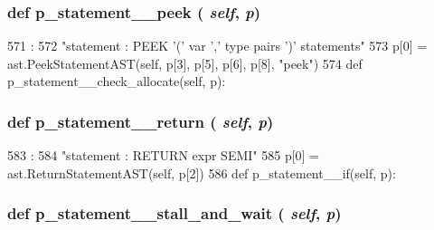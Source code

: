 \begin{DoxyVerb}
{\subsubsection[{p\_\-statement\_\-\_\-peek}]{\setlength{\rightskip}{0pt plus 5cm}def p\_\-statement\_\-\_\-peek ( {\em self}, \/   {\em p})}}
\label{classslicc_1_1parser_1_1SLICC_a015764d4d63d518e62c8b10217683dee}



\begin{DoxyCode}
571                                   :
572         "statement : PEEK '(' var ',' type pairs ')' statements"
573         p[0] = ast.PeekStatementAST(self, p[3], p[5], p[6], p[8], "peek")
574 
    def p_statement__check_allocate(self, p):
\end{DoxyCode}
\hypertarget{classslicc_1_1parser_1_1SLICC_a2e1afae014e0dda4da7c49f97517b021}{
\subsubsection[{p\_\-statement\_\-\_\-return}]{\setlength{\rightskip}{0pt plus 5cm}def p\_\-statement\_\-\_\-return ( {\em self}, \/   {\em p})}}
\label{classslicc_1_1parser_1_1SLICC_a2e1afae014e0dda4da7c49f97517b021}



\begin{DoxyCode}
583                                     :
584         "statement : RETURN expr SEMI"
585         p[0] = ast.ReturnStatementAST(self, p[2])
586 
    def p_statement__if(self, p):
\end{DoxyCode}
\hypertarget{classslicc_1_1parser_1_1SLICC_ab264a56ec5a28193c392750e09800825}{
\subsubsection[{p\_\-statement\_\-\_\-stall\_\-and\_\-wait}]{\setlength{\rightskip}{0pt plus 5cm}def p\_\-statement\_\-\_\-stall\_\-and\_\-wait ( {\em self}, \/   {\em p})}}
\label{classslicc_1_1parser_1_1SLICC_ab264a56ec5a28193c392750e09800825}




\end{DoxyVerb}
